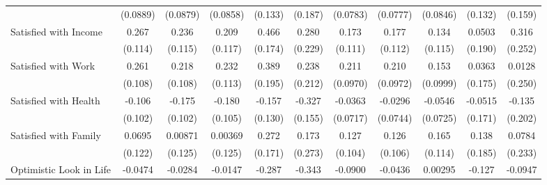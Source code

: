 {\begin{tabular}{l*{10}{c}}
            &    (0.0889)         &    (0.0879)         &    (0.0858)         &     (0.133)         &     (0.187)         &    (0.0783)         &    (0.0777)         &    (0.0846)         &     (0.132)         &     (0.159)         \\
\addlinespace
Satisfied with Income&       0.267\sym{*}  &       0.236\sym{*}  &       0.209         &       0.466\sym{**} &       0.280         &       0.173         &       0.177         &       0.134         &      0.0503         &       0.316         \\
            &     (0.114)         &     (0.115)         &     (0.117)         &     (0.174)         &     (0.229)         &     (0.111)         &     (0.112)         &     (0.115)         &     (0.190)         &     (0.252)         \\
\addlinespace
Satisfied with Work&       0.261\sym{*}  &       0.218\sym{*}  &       0.232\sym{*}  &       0.389\sym{*}  &       0.238         &       0.211\sym{*}  &       0.210\sym{*}  &       0.153         &      0.0363         &      0.0128         \\
            &     (0.108)         &     (0.108)         &     (0.113)         &     (0.195)         &     (0.212)         &    (0.0970)         &    (0.0972)         &    (0.0999)         &     (0.175)         &     (0.250)         \\
\addlinespace
Satisfied with Health&      -0.106         &      -0.175         &      -0.180         &      -0.157         &      -0.327\sym{*}  &     -0.0363         &     -0.0296         &     -0.0546         &     -0.0515         &      -0.135         \\
            &     (0.102)         &     (0.102)         &     (0.105)         &     (0.130)         &     (0.155)         &    (0.0717)         &    (0.0744)         &    (0.0725)         &     (0.171)         &     (0.202)         \\
\addlinespace
Satisfied with Family&      0.0695         &     0.00871         &     0.00369         &       0.272         &       0.173         &       0.127         &       0.126         &       0.165         &       0.138         &      0.0784         \\
            &     (0.122)         &     (0.125)         &     (0.125)         &     (0.171)         &     (0.273)         &     (0.104)         &     (0.106)         &     (0.114)         &     (0.185)         &     (0.233)         \\
\addlinespace
Optimistic Look in Life&     -0.0474         &     -0.0284         &     -0.0147         &      -0.287\sym{**} &      -0.343\sym{**} &     -0.0900         &     -0.0436         &     0.00295         &      -0.127         &     -0.0947         \\

\end{tabular}}
